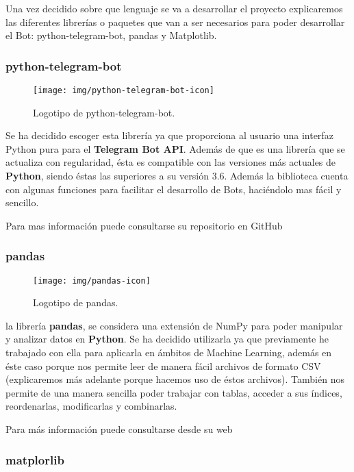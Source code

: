 Una vez decidido sobre que lenguaje se va a desarrollar el proyecto explicaremos las diferentes librerías o paquetes que van a ser necesarios para poder desarrollar el Bot: python-telegram-bot, pandas y Matplotlib.

\subsubsection{python-telegram-bot}

\begin{figure}[H]
	\centering
	\texttt{[image: img/python-telegram-bot-icon]}
	\caption{Logotipo de python-telegram-bot.}
\end{figure}

Se ha decidido escoger esta librería ya que proporciona al usuario una interfaz Python pura para el \textbf{Telegram Bot API}. Además de que es una librería que se actualiza con regularidad, ésta es compatible con las versiones más actuales de \textbf{Python}, siendo éstas las superiores a su versión 3.6. Además la biblioteca cuenta con algunas funciones para facilitar el desarrollo de Bots, haciéndolo mas fácil y sencillo.

Para mas información puede consultarse su repositorio en GitHub \cite{python-telegram-bot}

\subsubsection{pandas}

\begin{figure}[H]
	\centering
	\texttt{[image: img/pandas-icon]}
	\caption{Logotipo de pandas.}
\end{figure}

la librería \textbf{pandas}, se considera una extensión de NumPy para poder manipular y analizar datos en \textbf{Python}. Se ha decidido utilizarla ya que previamente he trabajado con ella para aplicarla en ámbitos de Machine Learning, además en éste caso porque nos permite leer de manera fácil archivos de formato CSV (explicaremos más adelante porque hacemos uso de éstos archivos). También nos permite de una manera sencilla poder trabajar con tablas, acceder a sus índices, reordenarlas, modificarlas y combinarlas.

Para más información puede consultarse desde su web \cite{pandas}

\subsubsection{matplorlib}


